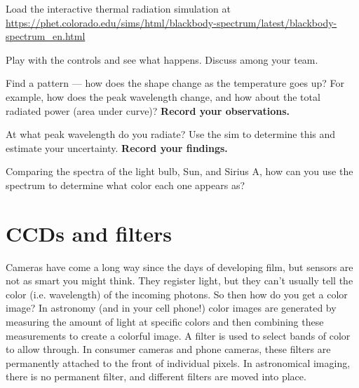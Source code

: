 \begin{steps}
	\item Load the interactive thermal radiation simulation at \url{https://phet.colorado.edu/sims/html/blackbody-spectrum/latest/blackbody-spectrum_en.html}
	
	\item Play with the controls and see what happens. Discuss among your team.
	
	\item Find a pattern --- how does the shape change as the temperature goes up? For example, how does the peak wavelength change, and how about the total radiated power (area under curve)? \textbf{Record your observations.}
	
	\item At what peak wavelength do you radiate? Use the sim to determine this and estimate your uncertainty. \textbf{Record your findings.}
	
	\item Comparing the spectra of the light bulb, Sun, and Sirius A, how can you use the spectrum to determine what color each one appears as?
\end{steps}

\section{CCDs and filters}

Cameras have come a long way since the days of developing film, but sensors are not as smart you might think. They register light, but they can't usually tell the color (i.e. wavelength) of the incoming photons. So then how do you get a color image? In astronomy (and in your cell phone!) color images are generated by measuring the amount of light at specific colors and then combining these measurements to create a colorful image. A filter is used to select bands of color to allow through. In consumer cameras and phone cameras, these filters are permanently attached to the front of individual pixels. In astronomical imaging, there is no permanent filter, and different filters are moved into place.

